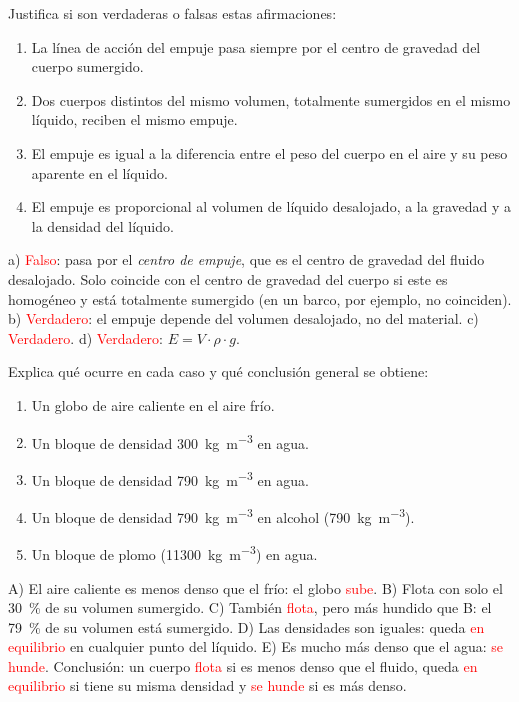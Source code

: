 \begin{exercise}
    Justifica si son verdaderas o falsas estas afirmaciones:
    \begin{enumerate}[label=\alph*)]
        \item La línea de acción del empuje pasa siempre por el centro de gravedad del cuerpo sumergido.
        \item Dos cuerpos distintos del mismo volumen, totalmente sumergidos en el mismo líquido, reciben el mismo empuje.
        \item El empuje es igual a la diferencia entre el peso del cuerpo en el aire y su peso aparente en el líquido.
        \item El empuje es proporcional al volumen de líquido desalojado, a la gravedad y a la densidad del líquido.
    \end{enumerate}
    \begin{solu}
        a) \textcolor{red}{Falso}: pasa por el \emph{centro de empuje}, que es el centro de gravedad del fluido desalojado. Solo coincide con el centro de gravedad del cuerpo si este es homogéneo y está totalmente sumergido (en un barco, por ejemplo, no coinciden).
        b) \textcolor{red}{Verdadero}: el empuje depende del volumen desalojado, no del material. c) \textcolor{red}{Verdadero}. d) \textcolor{red}{Verdadero}: \(E = V \cdot \rho \cdot g\).
    \end{solu}
\end{exercise}

\begin{exercise}
    Explica qué ocurre en cada caso y qué conclusión general se obtiene:
    \begin{enumerate}[label=\Alph*)]
        \item Un globo de aire caliente en el aire frío.
        \item Un bloque de densidad \qty{300}{\kg\per\cubic\m} en agua.
        \item Un bloque de densidad \qty{790}{\kg\per\cubic\m} en agua.
        \item Un bloque de densidad \qty{790}{\kg\per\cubic\m} en alcohol (\qty{790}{\kg\per\cubic\m}).
        \item Un bloque de plomo (\qty{11300}{\kg\per\cubic\m}) en agua.
    \end{enumerate}
    \begin{solu}
        A) El aire caliente es menos denso que el frío: el globo \textcolor{red}{sube}.
        B) Flota con solo el \qty{30}{\percent} de su volumen sumergido.
        C) También \textcolor{red}{flota}, pero más hundido que B: el \qty{79}{\percent} de su volumen está sumergido.
        D) Las densidades son iguales: queda \textcolor{red}{en equilibrio} en cualquier punto del líquido.
        E) Es mucho más denso que el agua: \textcolor{red}{se hunde}.
        Conclusión: un cuerpo \textcolor{red}{flota} si es menos denso que el fluido, queda \textcolor{red}{en equilibrio} si tiene su misma densidad y \textcolor{red}{se hunde} si es más denso.
    \end{solu}
\end{exercise}

